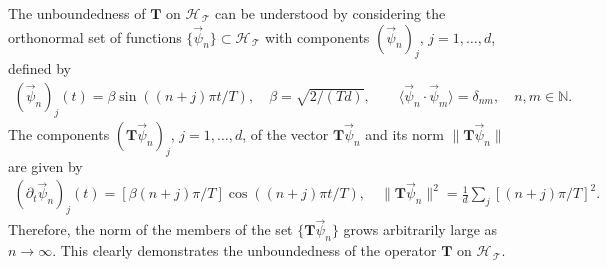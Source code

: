 \documentclass[11pt]{amsart}
\newcommand{\Tb}{\mathbf{T}}
\newcommand{\Tc}{\mathcal{T}}
\newcommand{\Hs}{\mathscr{H}}
\begin{document}
The unboundedness of $\Tb$ on $\Hs_{\,\Tc}$ can be understood by
considering the orthonormal set of functions
$\{\vec{\psi}_n\}\subset\Hs_{\,\Tc}$ with components $(\vec{\psi}_n)_j$, $j=1,\ldots,d$,
defined by  
%
\begin{align}\label{eq:Orthonormal}
  (\vec{\psi}_n)_j(t)=\beta\sin((n+j)\pi t/T), \quad
  \beta=\sqrt{2/(Td)},
  \qquad
  \langle\vec{\psi}_n\cdot\vec{\psi}_m\rangle=\delta_{nm}, \quad
  n,m\in\mathbb{N}.
\end{align}
%
The components $(\Tb\vec{\psi}_n)_j$, $j=1,\ldots,d$, of the vector
$\Tb\vec{\psi}_n$ and its norm $\|\Tb\vec{\psi}_n\|$ are given by
%
\begin{align}\label{eq:Orthonormal_Diff}
  (\partial_t\vec{\psi}_n)_j(t)=[\beta(n+j)\pi/T]\cos((n+j)\pi t/T),\quad
  \|\Tb\vec{\psi}_n\|^2%
               =\frac{1}{d}\sum_j[(n+j)\pi/T]^2.
\end{align}
%
Therefore, the norm of the members of the set $\{\Tb\vec{\psi}_n\}$
grows arbitrarily large as $n\to\infty$. This clearly demonstrates the
unboundedness of the operator $\Tb$ on $\Hs_{\,\Tc}$.
\end{document}
